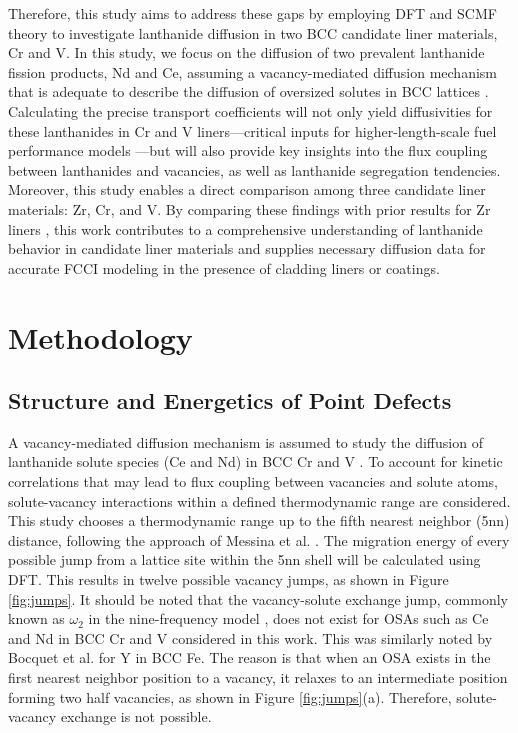 \documentclass[preprint,12pt]{elsarticle}
\begin{document}
Therefore, this study aims to address these gaps by employing DFT and SCMF theory to investigate lanthanide diffusion in two BCC candidate liner materials, Cr and V. In this study, we focus on the diffusion of two prevalent lanthanide fission products, Nd and Ce, assuming a vacancy-mediated diffusion mechanism that is adequate to describe the diffusion of oversized solutes in BCC lattices \cite{yang_significant_2023, bocquet_migration_2017}. Calculating the precise transport coefficients will not only yield diffusivities for these lanthanides in Cr and V liners—critical inputs for higher-length-scale fuel performance models \cite{HIRSCHHORN2025113811}—but will also provide key insights into the flux coupling between lanthanides and vacancies, as well as lanthanide segregation tendencies. Moreover, this study enables a direct comparison among three candidate liner materials: Zr, Cr, and V. By comparing these findings with prior results for Zr liners \cite{shousha2024first}, this work contributes to a comprehensive understanding of lanthanide behavior in candidate liner materials and supplies necessary diffusion data for accurate FCCI modeling in the presence of cladding liners or coatings.



\FloatBarrier
\section{Methodology}

\subsection{Structure and Energetics of Point Defects}
\label{sec:methods_energetics}
A vacancy-mediated diffusion mechanism is assumed to study the diffusion of lanthanide solute species (Ce and Nd) in BCC Cr and V \cite{yang_significant_2023, bocquet_migration_2017}. To account for kinetic correlations that may lead to flux coupling between vacancies and solute atoms, solute-vacancy interactions within a defined thermodynamic range are considered. This study chooses a thermodynamic range up to the fifth nearest neighbor (5nn) distance, following the approach of Messina et al. \cite{messina_exact_2014,MESSINA201328}. The migration energy of every possible jump from a lattice site within the 5nn shell will be calculated using DFT. This results in twelve possible vacancy jumps, as shown in Figure \ref{fig:jumps}. It should be noted that the vacancy-solute exchange jump, commonly known as $\omega_2$ in the nine-frequency model \cite{leclaire1970solvent}, does not exist for OSAs such as Ce and Nd in BCC Cr and V considered in this work. This was similarly noted by Bocquet et al. \cite{bocquet_migration_2017} for Y in BCC Fe. The reason is that when an OSA exists in the first nearest neighbor position to a vacancy, it relaxes to an intermediate position forming two half vacancies, as shown in Figure \ref{fig:jumps}(a). Therefore, solute-vacancy exchange is not possible.
\end{document}
